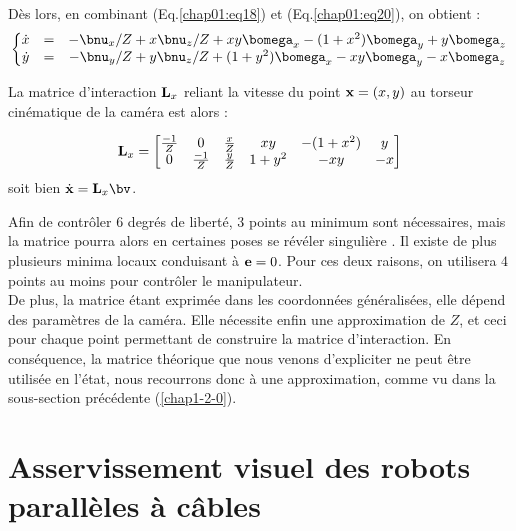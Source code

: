 D\`es lors, en combinant (Eq.\ref{chap01:eq18}) et (Eq.\ref{chap01:eq20}), on 
obtient :
\begin{equation}
\left \lbrace
\begin{matrix}
\dot x &=& -\bnu_x/Z +x\bnu_z/Z + xy\bomega_x -(1+x^2)\bomega_y + y \bomega_z \\
\dot y &=& -\bnu_y/Z +y\bnu_z/Z + (1+y^2)\bomega_x -xy\bomega_y - x \bomega_z
\end{matrix}
\right .
\label{chap01:eq22}
\end{equation}

La matrice d'interaction ${\bf L}_x$ reliant la vitesse du point ${\bf x} = 
(x,y)$ au torseur cin\'ematique de la cam\'era est alors :

\begin{equation}
{\bf L}_x =
\begin{bmatrix}
\frac {-1} Z & 0 & \frac x Z & xy & -(1+x^2) & y \\
0 & \frac {-1} Z & \frac y Z & 1+y^2 & -xy & -x
\end{bmatrix}
\label{chap01:eq23}
\end{equation}
soit bien $\dot {\bf x} = {\bf L}_x \bv$.

Afin de contr\^oler $6$ degr\'es de libert\'e, $3$ points au minimum sont 
n\'ecessaires, mais la matrice pourra alors en certaines poses se r\'ev\'eler 
singuli\`ere \cite{michel1993}. Il existe de plus plusieurs minima locaux 
conduisant \`a ${\bf e} = 0$. Pour ces deux raisons, on utilisera $4$ points au 
moins pour contr\^oler le manipulateur.\\

De plus, la matrice \'etant exprim\'ee dans les coordonn\'ees 
g\'en\'eralis\'ees, elle d\'epend des param\`etres de la cam\'era. Elle 
n\'ecessite enfin une approximation de $Z$, et ceci pour chaque point 
permettant de construire la matrice d'interaction. En cons\'equence, la matrice 
th\'eorique que nous venons d'expliciter ne peut \^etre utilis\'ee en l'\'etat, 
nous recourrons donc \`a une approximation, comme vu dans la sous-section 
pr\'ec\'edente (\ref{chap1-2-0}).

\section{Asservissement visuel des robots parallèles à 
câbles}\label{chap1-3}


